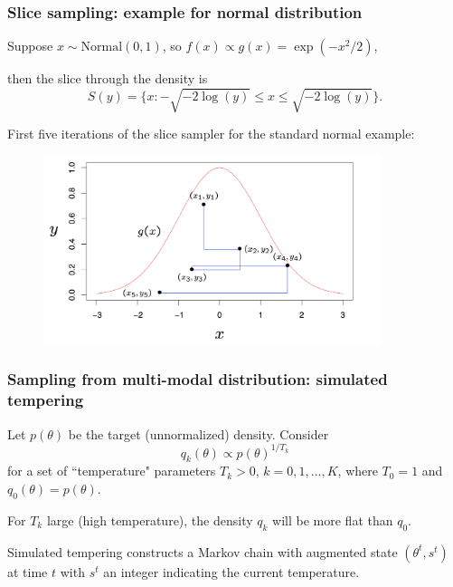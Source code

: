 \documentclass{beamer}
\begin{document}
\begin{frame}
  \frametitle{Slice sampling: example for normal distribution}
Suppose $x \sim \mbox{Normal}(0,1)$, so $f(x) \propto g(x) =
\exp(-x^2/2)$,

then the slice through the density is 
\[
S(y) = \{x: -\sqrt{-2\log(y)} \leq x \leq \sqrt{-2\log(y)}\}.
\]  

First five iterations of the slice sampler for the standard normal
example:
\begin{center}
\includegraphics[width=120mm, height=55mm]{slice_sampling_normal}
\end{center}
\end{frame}


\begin{frame}
  \frametitle{Sampling from multi-modal distribution: simulated tempering}
Let $p(\theta)$ be the target (unnormalized) density. Consider 
\[
q_k(\theta) \propto p(\theta)^{1/T_k}
\]
for a set of ``temperature" parameters $T_k > 0$, $k = 0, 1, \ldots,
K$, where $T_0 = 1$ and $q_0(\theta) = p(\theta)$.
\vspace{0.2cm}

For $T_k$ large (high temperature), the density $q_k$ will be more
flat than $q_0$.   

Simulated tempering constructs a Markov chain with augmented state $(\theta^t,
s^t)$ at time $t$ with $s^t$ an integer indicating the current temperature.
\end{frame}
\end{document}
